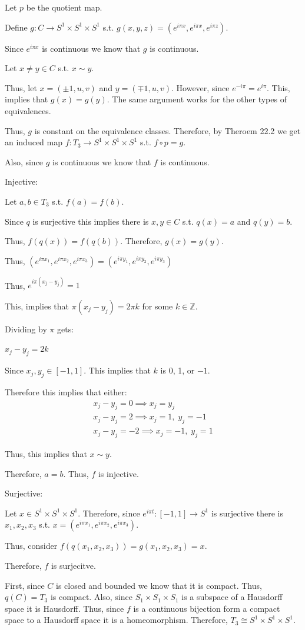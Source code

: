 \documentclass[12pt, letterpaper]{article}
\newcommand{\Z}{\mathbb{Z}}
\begin{document}
\begin{problemproof}
    Let $p$ be the quotient map.

    Define $g : C \to S^1 \times S^1 \times S^1$ s.t. $g(x,y,z)=(e^{i\pi x},e^{i\pi x},e^{i\pi z})$.

    Since $e^{i \pi x}$ is continuous we know that $g$ is continuous.

    Let $x \neq y \in C$ s.t. $x \sim y$.

    Thus, let $x=(\pm 1,u,v)$ and $y=(\mp 1, u ,v)$. However, since $e^{-i\pi}=e^{i\pi}$. This, implies that $g(x)=g(y)$. The same argument works for the other types of equivalences.

    Thus, $g$ is constant on the equivalence classes. Therefore, by Theroem 22.2 we get an induced map $f : T_3 \to S^1 \times S^1 \times S^1$ s.t. $f \circ p = g$.

    Also, since $g$ is continuous we know that $f$ is continuous.

    Injective:

    Let $a,b \in T_3$ s.t. $f(a)=f(b)$.

    Since $q$ is surjective this implies there is $x,y \in C$ s.t. $q(x)=a$ and $q(y)=b$.

    Thus, $f(q(x))=f(q(b))$. Therefore, $g(x)=g(y)$.

    Thus, $(e^{i\pi x_1},e^{i\pi x_2},e^{i\pi x_3})=(e^{i\pi y_1},e^{i\pi y_2},e^{i\pi y_3})$

    Thus, $e^{i \pi (x_j - y_j)}=1$

    This, implies that $\pi(x_j - y_j)=2 \pi k$ for some $k \in \Z$.

    Dividing by $\pi$ gets:

    $x_j-y_j = 2k$

    Since $x_j,y_j \in [-1,1]$. This implies that $k$ is 0, 1, or $-1$.

    Therefore this implies that either:
    \begin{align*}
        x_j-y_j=0 \implies x_j=y_j\\
        x_j-y_j=2 \implies x_j=1, \; y_j=-1\\
        x_j-y_j=-2 \implies x_j=-1, \; y_j=1
    \end{align*}

    Thus, this implies that $x \sim y$.

    Therefore, $a=b$. Thus, $f$ is injective.

    Surjective:

    Let $x \in S^1 \times S^1 \times S^1$. Therefore, since $e^{i\pi t} : [-1,1] \to S^1$ is surjective there is $x_1,x_2,x_3$ s.t. $x=(e^{i\pi x_1},e^{i \pi x_2}, e^{i \pi x_3})$.

    Thus, consider $f(q(x_1,x_2,x_3))=g(x_1,x_2,x_3)=x$.

    Therefore, $f$ is surjecitve.

    First, since $C$ is closed and bounded we know that it is compact. Thus, $q(C)=T_3$ is compact. Also, since $S_1 \times S_1 \times S_1$ is a subspace of a Hausdorff space it is Hausdorff. Thus, since $f$ is a continuous bijection form a compact space to a Hausdorff space it is a homeomorphism. Therefore, $T_3 \cong S^1 \times S^1 \times S^1$.
\end{problemproof}
\end{document}
